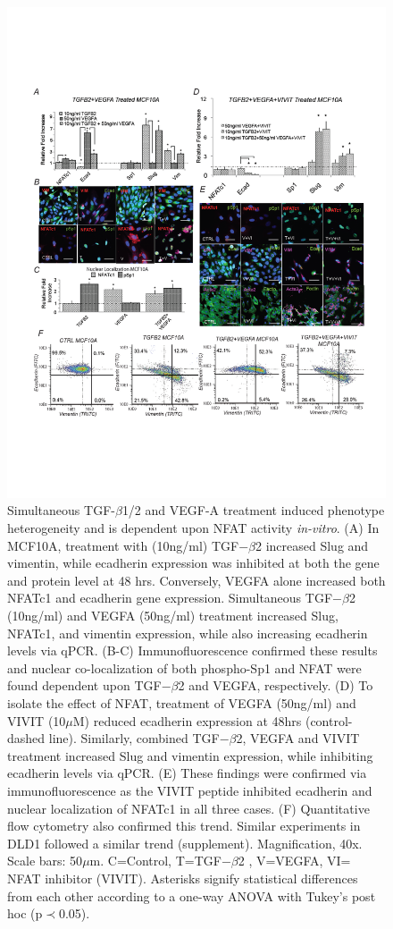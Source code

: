 \documentclass[11pt,letterpaper]{article}
\begin{document}
\begin{figure}
\includegraphics [width=1.0\linewidth] {./figs/Fig-5-MCF10A-Validation.pdf}
\caption{Simultaneous TGF-$\beta$1/2 and VEGF-A treatment induced phenotype heterogeneity and is dependent upon NFAT activity \emph{in-vitro}.  (A) In MCF10A, treatment with (10ng/ml) TGF$-\beta$2 increased Slug and vimentin, while ecadherin expression was inhibited at both the gene and protein level at 48 hrs.  Conversely, VEGFA alone increased both NFATc1 and ecadherin gene expression.  Simultaneous TGF$-\beta$2 (10ng/ml) and VEGFA (50ng/ml) treatment increased Slug, NFATc1, and vimentin expression, while also increasing ecadherin levels via qPCR.  (B-C)  Immunofluorescence confirmed these results and nuclear co-localization of both phospho-Sp1 and NFAT were found dependent upon TGF$-\beta$2 and VEGFA, respectively. (D) To isolate the effect of NFAT, treatment of VEGFA (50ng/ml) and VIVIT (10$\mu$M) reduced ecadherin expression at 48hrs (control-dashed line).  Similarly, combined TGF$-\beta$2, VEGFA and VIVIT treatment increased Slug and vimentin expression, while inhibiting ecadherin levels via qPCR.  (E) These findings were confirmed via immunofluorescence as the VIVIT peptide inhibited ecadherin and nuclear localization of NFATc1 in all three cases.  (F)  Quantitative flow cytometry also confirmed this trend.  Similar experiments in DLD1 followed a similar trend (supplement).  Magnification, 40x. Scale bars: 50$\mu$m.  C=Control, T=TGF$-\beta$2 , V=VEGFA, VI= NFAT inhibitor (VIVIT).  Asterisks signify statistical differences from each other according to a one-way ANOVA with Tukey's post hoc (p$\prec$0.05).}\label{fg:F5}
\end{figure}
\end{document}
